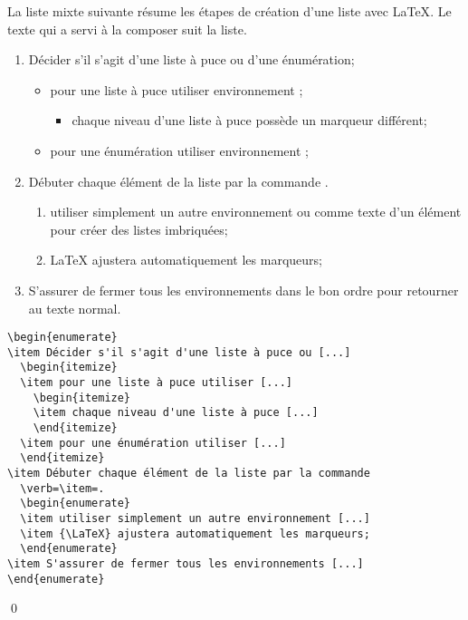\begin{exemple}
  La liste mixte suivante résume les étapes de création d'une liste
  avec {\LaTeX}. Le texte qui a servi à la composer suit la liste.
  \begin{enumerate}
  \item Décider s'il s'agit d'une liste à puce ou d'une énumération;
    \begin{itemize}
    \item pour une liste à puce utiliser environnement ;
      \begin{itemize}
      \item chaque niveau d'une liste à puce possède un marqueur
        différent;
      \end{itemize}
    \item pour une énumération utiliser environnement ;
    \end{itemize}
  \item Débuter chaque élément de la liste par la commande
    \cmdprint{\item}.
    \begin{enumerate}
    \item utiliser simplement un autre environnement  ou
       comme texte d'un élément pour créer des listes
      imbriquées;
    \item {\LaTeX} ajustera automatiquement les marqueurs;
    \end{enumerate}
  \item S'assurer de fermer tous les environnements dans le bon ordre
    pour retourner au texte normal.
  \end{enumerate}

  \begin{demo}
\begin{lstlisting}[emph={enumerate,itemize}]
\begin{enumerate}
\item Décider s'il s'agit d'une liste à puce ou [...]
  \begin{itemize}
  \item pour une liste à puce utiliser [...]
    \begin{itemize}
    \item chaque niveau d'une liste à puce [...]
    \end{itemize}
  \item pour une énumération utiliser [...]
  \end{itemize}
\item Débuter chaque élément de la liste par la commande
  \verb=\item=.
  \begin{enumerate}
  \item utiliser simplement un autre environnement [...]
  \item {\LaTeX} ajustera automatiquement les marqueurs;
  \end{enumerate}
\item S'assurer de fermer tous les environnements [...]
\end{enumerate}
\end{lstlisting}
  \qed
  \end{demo}
\end{exemple}

